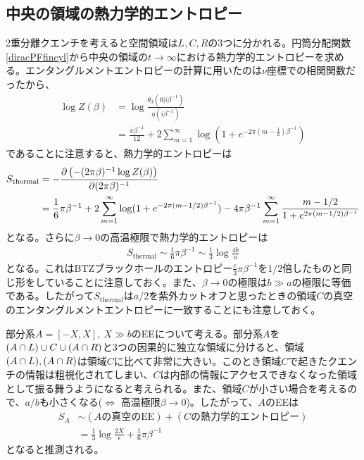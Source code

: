 \subsection{中央の領域の熱力学的エントロピー}
2重分離クエンチを考えると空間領域は$L,C,R$の$3$つに分かれる。円筒分配関数\ref{diracPFfincyl}から中央の領域の$t\to\infty$における熱力学的エントロピーを求める。エンタングルメントエントロピーの計算に用いたのは$\nu$座標での相関関数だったから、
\begin{align}
\log Z(\beta) &= \log \frac{\theta_3(0|i\beta^{-1})}{\eta(i\beta^{-1})}\\ &=\frac{\pi\beta^{-1}}{12}+2\sum_{m=1}^{\infty}\log (1+e^{-2\pi(m-\frac{1}{2})\beta^{-1}})
\end{align}
であることに注意すると、熱力学的エントロピーは
\begin{align}
S_\text{thermal}&=-\frac{\partial \left(-(2\pi\beta)^{-1}\log Z(\beta)\right)}{\partial (2\pi\beta)^{-1}}\\
&=\frac{1}{6}\pi\beta^{-1}+2\sum_{m=1}^{\infty} \log(1+e^{-2\pi (m-1/2)\beta^{-1}})-4\pi\beta^{-1}\sum_{m=1}^{\infty}\frac{m-1/2}{1+e^{2\pi (m-1/2)\beta^{-1}}}
\end{align}
となる。さらに$\beta\to 0$の高温極限で熱力学的エントロピーは
\begin{align}
S_\text{thermal}\sim \frac{1}{6}\pi\beta^{-1}\sim \frac{1}{3}\log\frac{4b}{a}
\end{align}
となる。これはBTZブラックホールのエントロピー$\frac{c}{3}\pi\beta^{-1}$を$1/2$倍したものと同じ形をしていることに注意しておく。また、$\beta\to 0$の極限は$b\gg a$の極限に等価である。したがって$S_\text{thermal}$は$a/2$を紫外カットオフと思ったときの領域$C$の真空のエンタングルメントエントロピーに一致することにも注意しておく。

部分系$A=[-X,X],\ X\gg b$のEEについて考える。部分系$A$を$(A\cap L)\cup C \cup (A\cap R)$と3つの因果的に独立な領域に分けると、領域$(A\cap L),(A\cap R)$は領域$C$に比べて非常に大きい。このとき領域$C$で起きたクエンチの情報は粗視化されてしまい、$C$は内部の情報にアクセスできなくなった領域として振る舞うようになると考えられる。また、領域$C$が小さい場合を考えるので、$a/b$も小さくなる($\iff$ 高温極限$\beta\to 0$)。したがって、$A$のEEは
\begin{align}
S_A&\sim (A\text{の真空のEE})+(C\text{の熱力学的エントロピー})\\
&=\frac{1}{3}\log\frac{2X}{\epsilon}+\frac{1}{6}\pi\beta^{-1}\label{thermalization}
\end{align}
となると推測される。

